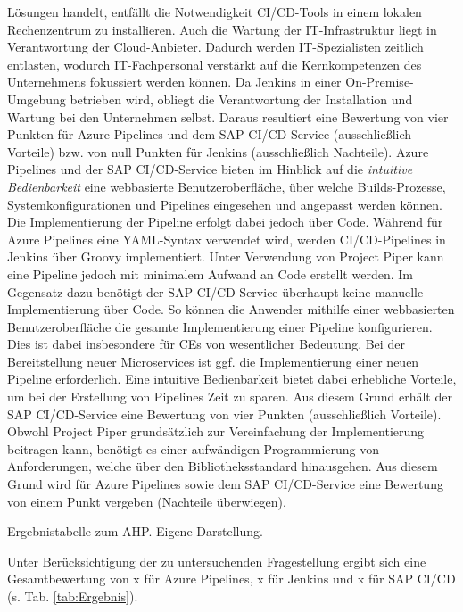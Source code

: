 Lösungen handelt, entfällt die Notwendigkeit CI/CD-Tools in einem lokalen Rechenzentrum zu installieren. Auch die Wartung der IT-Infrastruktur liegt in Verantwortung der Cloud-Anbieter. Dadurch werden IT-Spezialisten zeitlich entlasten, wodurch IT-Fachpersonal verstärkt auf die Kernkompetenzen des Unternehmens fokussiert werden können. Da Jenkins in einer On-Premise-Umgebung betrieben wird, obliegt die Verantwortung der Installation und Wartung bei den Unternehmen selbst. Daraus resultiert eine Bewertung von vier Punkten für Azure Pipelines und dem SAP CI/CD-Service (ausschließlich Vorteile) bzw. von null Punkten für Jenkins (ausschließlich Nachteile). Azure Pipelines und der SAP CI/CD-Service bieten im Hinblick auf die \textit{intuitive Bedienbarkeit} eine webbasierte Benutzeroberfläche, über welche Builds-Prozesse, Systemkonfigurationen und Pipelines eingesehen und angepasst werden können. Die Implementierung der Pipeline erfolgt dabei jedoch über Code. Während für Azure Pipelines eine YAML-Syntax verwendet wird, werden CI/CD-Pipelines in Jenkins über Groovy implementiert. Unter Verwendung von Project Piper kann eine Pipeline jedoch mit minimalem Aufwand an Code erstellt werden. Im Gegensatz dazu benötigt der SAP CI/CD-Service überhaupt keine manuelle Implementierung über Code. So können die Anwender mithilfe einer webbasierten Benutzeroberfläche die gesamte Implementierung einer Pipeline konfigurieren. Dies ist dabei insbesondere für CEs von wesentlicher Bedeutung. Bei der Bereitstellung neuer Microservices ist ggf. die Implementierung einer neuen Pipeline erforderlich. Eine intuitive Bedienbarkeit bietet dabei erhebliche Vorteile, um bei der Erstellung von Pipelines Zeit zu sparen. Aus diesem Grund erhält der SAP CI/CD-Service eine Bewertung von vier Punkten (ausschließlich Vorteile). Obwohl Project Piper grundsätzlich zur Vereinfachung der Implementierung beitragen kann, benötigt es einer aufwändigen Programmierung von Anforderungen, welche über den Bibliotheksstandard hinausgehen. Aus diesem Grund wird für Azure Pipelines sowie dem SAP CI/CD-Service eine Bewertung von einem Punkt vergeben (Nachteile überwiegen).
\begin{center}
	\begin{table}[H]
		\centering
		\caption[Ergebnistabelle zum AHP]{Ergebnistabelle zum AHP. Eigene Darstellung.}
		\label{tab:Ergebnis}
	\end{table}
\end{center}
\vspace*{-15mm}
Unter Berücksichtigung der zu untersuchenden Fragestellung ergibt sich eine Gesamtbewertung von x für Azure Pipelines, x für Jenkins und x für SAP CI/CD (s. Tab. \ref{tab:Ergebnis}).

